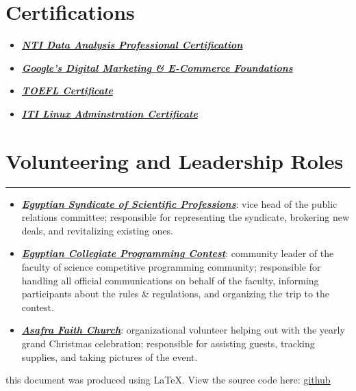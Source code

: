 \documentclass[10pt]{article}
\newcommand{\fancy}[1]{\Large\textbf{\textit{#1}}}
\begin{document}

\section*{Certifications}
\begin{itemize}
	\item \fancy{\href{https://drive.google.com/file/d/1mfSC_p8ubkJnYzdMbSP2kzq0KO0xso30/view?usp=sharing}{NTI Data Analysis Professional Certification} \quad\quad}
	\item \fancy{\href{https://drive.google.com/file/d/1955TZraJBMhCvt817PJTLI1tr5zcAoqw/view?usp=sharing}{Google's Digital Marketing \& E-Commerce Foundations} \quad\quad}
	\item \fancy{\href{https://drive.google.com/file/d/1S9nyRJj5tY12hFw3_XthDpG-YLtbXHaj/view?usp=sharing}{TOEFL Certificate} \quad\quad}
	\item \fancy{\href{https://drive.google.com/file/d/1WcM3YUQOT4w0M9fh1rSaY6zbrRgl6hi6/view?usp=sharing}{ITI Linux Adminstration Certificate}}
\end{itemize}


\section*{Volunteering and Leadership Roles}
\hrule
\vspace{1em}
\begin{itemize}
	\item \fancy{\href{https://www.linkedin.com/company/syndicate-of-scientific-professions-alexandria-نقابة-المهن-العلمية-الإسكندرية/}{Egyptian Syndicate of Scientific Professions}}: vice head of the public relations committee; responsible for representing the syndicate, brokering new deals, and revitalizing existing ones.
	\item \fancy{\href{https://www.linkedin.com/showcase/ecpc-egyptian-collegiate-programming-contest1/}{Egyptian Collegiate Programming Contest}}: community leader of the faculty of science competitive programming community; responsible for handling all official communications on behalf of the faculty, informing participants about the rules \& regulations, and organizing the trip to the contest.
	\item \fancy{\href{https://www.linkedin.com/company/asafra-faith-church/}{Asafra Faith Church}}: organizational volunteer helping out with the yearly grand Christmas celebration; responsible for assisting guests, tracking supplies, and taking pictures of the event.
\end{itemize}



\begin{center}
	{\tiny this document was produced using \LaTeX. View the source code here: \href{https://github.com/aaamw2000/myLaTeX/tree/main/pii/myCV}{github}}
\end{center}
\end{document}
